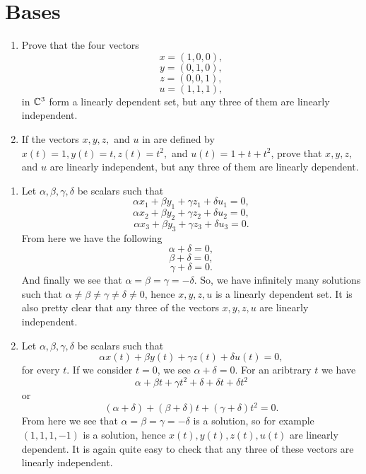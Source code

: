 \section{Bases}


\begin{problem}
  \begin{enumerate}[label=(\alph*)]
    \item Prove that the four vectors
      \[x = (1, 0, 0),\]
      \[y = (0, 1, 0),\]
      \[z = (0, 0, 1),\]
      \[u = (1, 1, 1),\]
      in $\mathbb{C}^3$ form a linearly dependent set, but any three of them are linearly independent.
    \item If the vectors $x, y, z,$ and $u$ in  are defined by $x(t) = 1, y(t) = t, z(t) = t^2,$ and $u(t) = 1 + t + t^2$, prove that $x, y, z,$ and $u$ are linearly independent, but any three of them are linearly dependent.
  \end{enumerate}
\end{problem}

\begin{solution}
  \begin{enumerate}[label=(\alph*)]
    \item Let $\alpha, \beta, \gamma, \delta$ be scalars such that
      \[\alpha x_1 + \beta y_1 + \gamma z_1 + \delta u_1 = 0,\]
      \[\alpha x_2 + \beta y_2 + \gamma z_2 + \delta u_2 = 0,\]
      \[\alpha x_3 + \beta y_3 + \gamma z_3 + \delta u_3 = 0.\]
      From here we have the following
      \[\alpha + \delta = 0,\]
      \[\beta + \delta = 0,\]
      \[\gamma + \delta = 0.\]
      And finally we see that $\alpha = \beta = \gamma = -\delta$.
      So, we have infinitely many solutions such that $\alpha \neq \beta \neq \gamma \neq \delta \neq 0$, hence $x, y, z, u$ is a linearly dependent set.
      It is also pretty clear that any three of the vectors $x, y, z, u$ are linearly independent.
    \item Let $\alpha, \beta, \gamma, \delta$ be scalars such that
      \[\alpha x(t) + \beta y(t) + \gamma z(t) + \delta u(t) = 0,\]
      for every $t$.
      If we consider $t = 0$, we see $\alpha + \delta = 0$.
      For an aribtrary $t$ we have
      \[\alpha + \beta t + \gamma t^2 + \delta + \delta t + \delta t^2\]
      or
      \[(\alpha + \delta) + (\beta + \delta)t + (\gamma + \delta)t^2 = 0.\]
      From here we see that $\alpha = \beta = \gamma = -\delta$ is a solution, so for example $(1, 1, 1, -1)$ is a solution, hence $x(t), y(t), z(t), u(t)$ are linearly dependent.
      It is again quite easy to check that any three of these vectors are linearly independent.
  \end{enumerate}
\end{solution}

